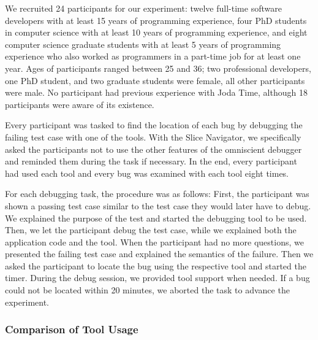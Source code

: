 We recruited 24 participants for our experiment:
twelve full-time software developers with at least 15 years of programming experience, 
four PhD students in computer science with at least 10 years of programming experience,
and eight computer science graduate students with at least 5 years of programming experience who also worked as programmers in a part-time job for at least one year.
Ages of participants ranged between 25 and 36; two professional developers, one PhD student, and two graduate students were female, all other participants were male.
No participant had previous experience with Joda Time, although 18 participants were aware of its existence.

Every participant was tasked to find the location of each bug by debugging the failing test case with one of the tools.
With the Slice Navigator, we specifically asked the participants not to use the other features of the omniscient debugger and reminded them during the task if necessary.
In the end, every participant had used each tool and every bug was examined with each tool eight times.

For each debugging task, the procedure was as follows:
First, the participant was shown a passing test case similar to the test case they would later have to debug.
We explained the purpose of the test and started the debugging tool to be used.
Then, we let the participant debug the test case, while we explained both the application code and the tool.
When the participant had no more questions, we presented the failing test case and explained the semantics of the failure.
Then we asked the participant to locate the bug using the respective tool and started the timer.
During the debug session, we provided tool support when needed.
If a bug could not be located within 20 minutes, we aborted the task to advance the experiment.

\subsubsection{Comparison of Tool Usage}

